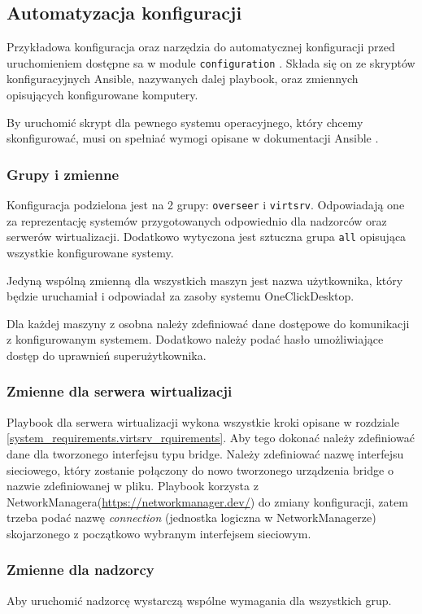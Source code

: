 \documentclass[../opis-rozwiazania.tex]{subfiles}
\begin{document}
\subsection{Automatyzacja konfiguracji}
\label{system_requirements.ansible_conf}
Przykładowa konfiguracja oraz narzędzia do automatycznej konfiguracji przed uruchomieniem dostępne sa w module \texttt{configuration} \parencite{ocd-configuration}.
Składa się on ze skryptów konfiguracyjnych Ansible, nazywanych dalej playbook, oraz zmiennych opisujących konfigurowane komputery.

By uruchomić skrypt dla pewnego systemu operacyjnego, który chcemy skonfigurować, musi on spełniać wymogi opisane w dokumentacji Ansible \parencite{ansible-connection}.

\subsubsection{Grupy i zmienne}
Konfiguracja podzielona jest na 2 grupy: \texttt{overseer} i \texttt{virtsrv}.
Odpowiadają one za reprezentację systemów przygotowanych odpowiednio dla nadzorców oraz serwerów wirtualizacji.
Dodatkowo wytyczona jest sztuczna grupa \texttt{all} opisująca wszystkie konfigurowane systemy.

Jedyną wspólną zmienną dla wszystkich maszyn jest nazwa użytkownika, który będzie uruchamiał i odpowiadał za zasoby systemu OneClickDesktop.

Dla każdej maszyny z osobna należy zdefiniować dane dostępowe do komunikacji z konfigurowanym systemem. Dodatkowo należy podać hasło umożliwiające dostęp do uprawnień superużytkownika.

\subsubsection{Zmienne dla serwera wirtualizacji}
Playbook dla serwera wirtualizacji wykona wszystkie kroki opisane w rozdziale \ref{system_requirements.virtsrv_rquirements}.
Aby tego dokonać należy zdefiniować dane dla tworzonego interfejsu typu bridge.
Należy zdefiniować nazwę interfejsu sieciowego, który zostanie połączony do nowo tworzonego urządzenia bridge o nazwie zdefiniowanej w pliku.
Playbook korzysta z NetworkManagera(\url{https://networkmanager.dev/}) do zmiany konfiguracji, zatem trzeba podać nazwę \textit{connection} (jednostka logiczna w NetworkManagerze) skojarzonego z początkowo wybranym interfejsem sieciowym.

\subsubsection{Zmienne dla nadzorcy}
Aby uruchomić nadzorcę wystarczą wspólne wymagania dla wszystkich grup.
\end{document}
